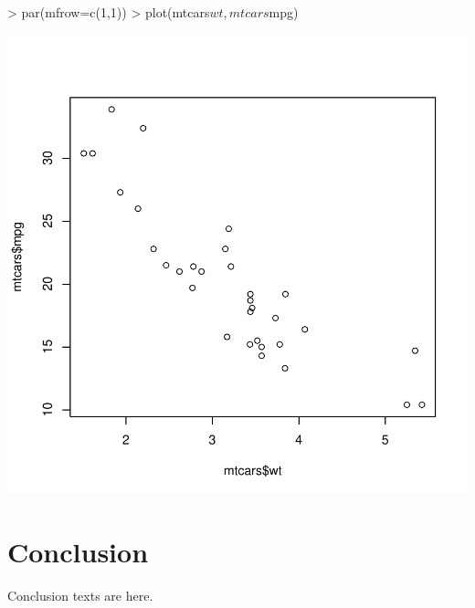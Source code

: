 \documentclass{article}
\begin{document}
\begin{Schunk}
\begin{Sinput}
> par(mfrow=c(1,1))
> plot(mtcars$wt,mtcars$mpg)
\end{Sinput}
\end{Schunk}
\includegraphics{examp2-003}
\section{Conclusion}
Conclusion texts are here.
\end{document}
